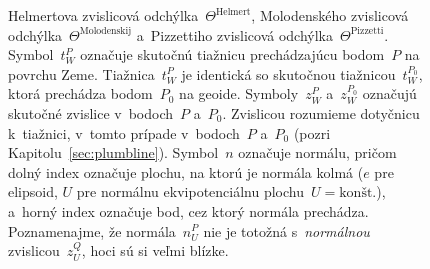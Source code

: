 \documentclass[a4paper,12pt]{book}
\begin{document}
\begin{figure}[bt]
\centering

\caption{Helmertova zvislicová odchýlka~$\Theta^\textrm{Helmert}$, Molodenského 
zvislicová odchýlka~$\Theta^\textrm{Molodenskij}$ a~Pizzettiho zvislicová 
odchýlka~$\Theta^\textrm{Pizzetti}$.  Symbol~$t_W^P$ označuje skutočnú tiažnicu 
prechádzajúcu bodom~$P$ na povrchu Zeme.  Tiažnica~$t_W^P$ je identická so 
skutočnou tiažnicou~$t_W^{P_0}$, ktorá prechádza bodom~$P_0$ na geoide.  
Symboly~$z_W^P$ a~$z_W^{P_0}$ označujú skutočné zvislice v~bodoch~$P$ a~$P_0$.  
Zvislicou rozumieme dotyčnicu k~tiažnici, v~tomto prípade v~bodoch~$P$ a~$P_0$ 
(pozri Kapitolu~\ref{sec:plumbline}).  Symbol~$n$ označuje normálu, pričom 
dolný index označuje plochu, na ktorú je normála kolmá ($e$ pre elipsoid, $U$ 
pre normálnu ekvipotenciálnu plochu~$U = \textrm{kon\v{s}t.}$), a~horný index 
označuje bod, cez ktorý normála prechádza.  Poznamenajme, že normála~$n_U^P$ 
nie je totožná s~\emph{normálnou} zvislicou~$z_U^Q$, hoci sú si veľmi blízke.}
\label{fig:deflections}
\end{figure}
\end{document}
